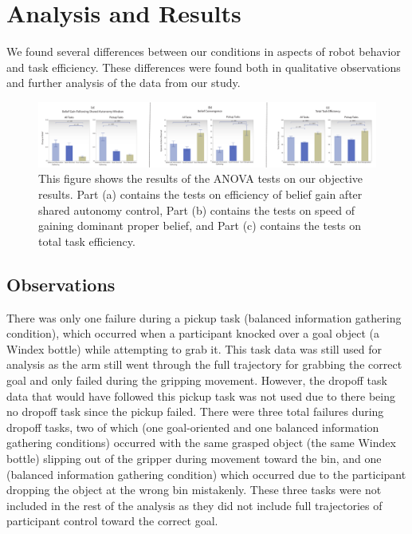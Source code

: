 \documentclass[conference]{IEEEtran}
\begin{document}
\section{Analysis and Results}

We found several differences between our conditions in aspects of robot behavior and task efficiency. These differences were found both in qualitative observations and further analysis of the data from our study.

\begin{figure}
\includegraphics[width=\textwidth]{figures/CR_All_Measures.pdf}
\caption{This figure shows the results of the ANOVA tests on our objective results. Part (a) contains the tests on efficiency of belief gain after shared autonomy control, Part (b) contains the tests on speed of gaining dominant proper belief, and Part (c) contains the tests on total task efficiency.}
\label{picture_results}
\end{figure}

\subsection{Observations}
There was only one failure during a pickup task (balanced information gathering condition), which occurred when a participant knocked over a goal object (a Windex bottle) while attempting to grab it. This task data was still used for analysis as the arm still went through the full trajectory for grabbing the correct goal and only failed during the gripping movement. However, the dropoff task data that would have followed this pickup task was not used due to there being no dropoff task since the pickup failed. There were three total failures during dropoff tasks, two of which (one goal-oriented and one balanced information gathering conditions) occurred with the same grasped object (the same Windex bottle) slipping out of the gripper during movement toward the bin, and one (balanced information gathering condition) which occurred due to the participant dropping the object at the wrong bin mistakenly. These three tasks were not included in the rest of the analysis as they did not include full trajectories of participant control toward the correct goal.
\end{document}
